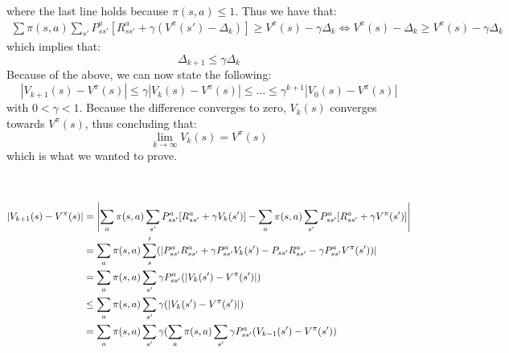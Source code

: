\documentclass{article}
\begin{document}
where the last line holds because $\pi(s,a) \leq 1$. Thus we have that:
\begin{align}
\sum\limits \pi (s,a) \sum_{s'} P^a_{ss'} [R^a_{ss'} + \gamma(V^\pi(s') - \Delta_k)] \geq V^\pi (s) - \gamma \Delta_k \Leftrightarrow V^\pi(s) - \Delta_k \geq V^\pi(s) - \gamma \Delta_k
\end{align}
which implies that:
\begin{equation}
\Delta_{k+1} \leq \gamma \Delta_k
\end{equation}
Because of the above, we can now state the following:
\begin{equation}
| V_{k+1}(s) - V^\pi(s)| \leq \gamma | V_k(s) - V^\pi(s) | \leq \dots \leq \gamma^{k+1} | V_{0}(s) - V^\pi(s)|
\end{equation}
with $0 < \gamma < 1$. Because the difference converges to zero, $V_k(s)$ converges towards $V^\pi(s)$, thus concluding that: 
\begin{equation}
\lim_{k \rightarrow \infty} V_k(s) = V^\pi(s)
\end{equation}
which is what we wanted to prove.
\\
\\
\\
\begin{align}
| V_{k+1}(s) - V^\pi(s) | &=  \left| \sum\limits_a \pi(s,a) \sum\limits_{s'} P^a_{ss'} [ R^a_{ss'} + \gamma V_k(s')]  - \sum\limits_a \pi(s,a) \sum\limits_{s'} P^a_{ss'} [ R^a_{ss'} + \gamma V^\pi(s')] \right| \\
&= \sum\limits\limits_a \pi (s,a) \sum\limits_s' ( | P_{ss'}^a R_{ss'}^a + \gamma P_{ss'}^a V_k(s') - P_{ss'} R_{ss'}^a - \gamma P_{ss'}^a V^\pi (s'))| \\
&= \sum\limits_a \pi(s,a) \sum\limits_{s'} \gamma P_{ss'}^a (|V_k(s') - V^\pi(s')|) \\
&\leq \sum\limits_a \pi(s,a) \sum\limits_{s'} \gamma (|V_k(s') - V^\pi(s')|) \\
&= \sum\limits_a \pi (s,a) \sum\limits_{s'} \gamma ( \sum\limits_a \pi (s,a) \sum\limits_{s'} \gamma P_{ss'}^a ( V_{k-1}(s') - V^\pi (s'))
\end{align}
\end{document}
